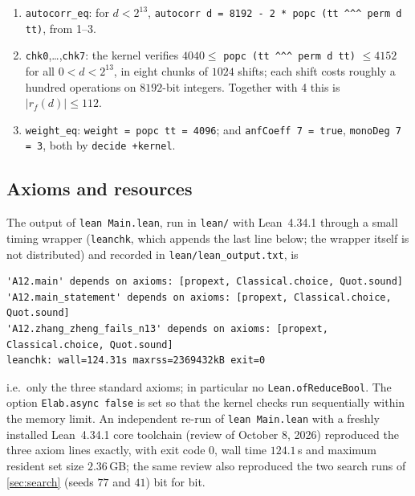 \documentclass[11pt]{article}
\numberwithin{equation}{section}
\theoremstyle{definition}
\theoremstyle{remark}
\begin{document}
\begin{enumerate}
\texttt{popc V := Y (V \&\&\& (2\textasciicircum{}8192-1)) 586 \% 16383} and \texttt{cntBits V m} is the naive count of set
bits below $m$.
\item \texttt{autocorr\_eq}: for $d<2^{13}$, \texttt{autocorr d = 8192 - 2 * popc (tt \textasciicircum{}\textasciicircum{}\textasciicircum{} perm d tt)},
from 1--3.
\item \texttt{chk0},\dots,\texttt{chk7}: the kernel verifies $4040\le$ \texttt{popc (tt \textasciicircum{}\textasciicircum{}\textasciicircum{} perm d tt)}
$\le4152$ for all $0<d<2^{13}$, in eight chunks of $1024$ shifts; each shift costs roughly a hundred
operations on $8192$-bit integers. Together with 4 this is $|r_f(d)|\le 112$.
\item \texttt{weight\_eq}: \texttt{weight = popc tt = 4096}; and \texttt{anfCoeff 7 = true},
\texttt{monoDeg 7 = 3}, both by \texttt{decide +kernel}.
\end{enumerate}

\subsection{Axioms and resources}
The output of \texttt{lean Main.lean}, run in \texttt{lean/} with Lean~4.34.1 through a small timing
wrapper (\texttt{leanchk}, which appends the last line below; the wrapper itself is not distributed) and
recorded in \texttt{lean/lean\_output.txt}, is
\begin{lstlisting}
'A12.main' depends on axioms: [propext, Classical.choice, Quot.sound]
'A12.main_statement' depends on axioms: [propext, Classical.choice, Quot.sound]
'A12.zhang_zheng_fails_n13' depends on axioms: [propext, Classical.choice, Quot.sound]
leanchk: wall=124.31s maxrss=2369432kB exit=0
\end{lstlisting}
i.e.\ only the three standard axioms; in particular no \texttt{Lean.ofReduceBool}. The option
\texttt{Elab.async false} is set so that the kernel checks run sequentially within the memory limit.
An independent re-run of \texttt{lean Main.lean} with a freshly installed Lean~4.34.1 core toolchain
(review of October 8, 2026) reproduced the three axiom lines exactly, with exit code $0$, wall time
$124.1$\,s and maximum resident set size $2.36$\,GB; the same review also reproduced the two search runs
of \cref{sec:search} (seeds $77$ and $41$) bit for bit.
\end{document}
